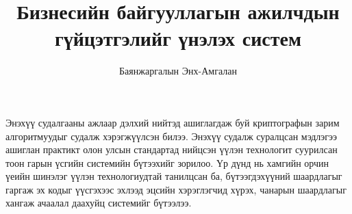 \documentclass[12pt,A4]{report}
\begin{document}

\title{Бизнесийн байгууллагын ажилчдын гүйцэтгэлийг үнэлэх систем}
\author{Баянжаргалын Энх-Амгалан}













% 


Энэхүү судалгааны ажлаар дэлхий нийтэд ашиглагдаж буй криптографын зарим алгоритмуудыг судалж хэрэгжүүлсэн билээ. Энэхүү судалж суралцсан мэдлэгээ ашиглан практикт олон улсын стандартад нийцсэн үүлэн технологит суурилсан тоон гарын үсгийн системийн бүтээхийг зорилоо. Үр дүнд нь хамгийн орчин үеийн шинэлэг үүлэн технологиудтай танилцсан ба, бүтээгдэхүүний шаардлагыг гаргаж эх кодыг үүсгэхээс эхлээд эцсийн хэрэглэгчид хүрэх, чанарын шаардлагыг хангаж ачаалал даахуйц системийг бүтээлээ.
\end{document}
